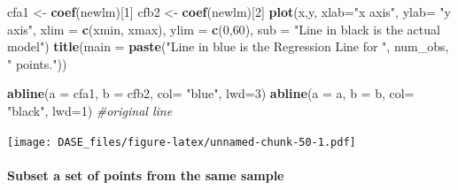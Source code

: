 \documentclass[]{book}
\newenvironment{Shaded}{\begin{snugshade}}{\end{snugshade}}
\newcommand{\KeywordTok}[1]{\textcolor[rgb]{0.13,0.29,0.53}{\textbf{{#1}}}}
\newcommand{\DataTypeTok}[1]{\textcolor[rgb]{0.13,0.29,0.53}{{#1}}}
\newcommand{\DecValTok}[1]{\textcolor[rgb]{0.00,0.00,0.81}{{#1}}}
\newcommand{\StringTok}[1]{\textcolor[rgb]{0.31,0.60,0.02}{{#1}}}
\newcommand{\CommentTok}[1]{\textcolor[rgb]{0.56,0.35,0.01}{\textit{{#1}}}}
\newcommand{\NormalTok}[1]{{#1}}
\let\oldparagraph\paragraph
\renewcommand{\paragraph}[1]{\oldparagraph{#1}\mbox{}}
\begin{document}
\begin{Shaded}
\begin{Highlighting}[]
\NormalTok{cfa1 <-}\StringTok{ }\KeywordTok{coef}\NormalTok{(newlm)[}\DecValTok{1}\NormalTok{]}
\NormalTok{cfb2 <-}\StringTok{ }\KeywordTok{coef}\NormalTok{(newlm)[}\DecValTok{2}\NormalTok{]}
\KeywordTok{plot}\NormalTok{(x,y, }\DataTypeTok{xlab=}\StringTok{"x axis"}\NormalTok{, }\DataTypeTok{ylab=} \StringTok{"y axis"}\NormalTok{, }\DataTypeTok{xlim =} \KeywordTok{c}\NormalTok{(xmin, xmax), }\DataTypeTok{ylim =} \KeywordTok{c}\NormalTok{(}\DecValTok{0}\NormalTok{,}\DecValTok{60}\NormalTok{), }\DataTypeTok{sub =} \StringTok{"Line in black is the actual model"}\NormalTok{)}
\KeywordTok{title}\NormalTok{(}\DataTypeTok{main =} \KeywordTok{paste}\NormalTok{(}\StringTok{"Line in blue is the Regression Line for "}\NormalTok{, num_obs, }\StringTok{" points."}\NormalTok{))}

\KeywordTok{abline}\NormalTok{(}\DataTypeTok{a =} \NormalTok{cfa1, }\DataTypeTok{b =} \NormalTok{cfb2, }\DataTypeTok{col=} \StringTok{"blue"}\NormalTok{, }\DataTypeTok{lwd=}\DecValTok{3}\NormalTok{)}
\KeywordTok{abline}\NormalTok{(}\DataTypeTok{a =} \NormalTok{a, }\DataTypeTok{b =} \NormalTok{b, }\DataTypeTok{col=} \StringTok{"black"}\NormalTok{, }\DataTypeTok{lwd=}\DecValTok{1}\NormalTok{) }\CommentTok{#original line}
\end{Highlighting}
\end{Shaded}

\texttt{[image: DASE\_files/figure-latex/unnamed-chunk-50-1.pdf]}

\paragraph{Subset a set of points from the same
sample}\label{subset-a-set-of-points-from-the-same-sample}
\end{document}
